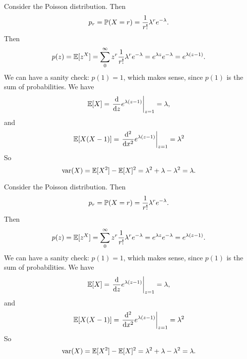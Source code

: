 \begin{note}
  \begin{field}
    \begin{eg}
      Consider the Poisson distribution. Then
      \[
        p_r = \P(X = r) = \frac{1}{r!}\lambda^r e^{-\lambda}.
      \]
      Then
      \[
        p(z) = \E[z^X] = \sum_0^\infty z^r \frac{1}{r!}\lambda^r e^{-\lambda} = e^{\lambda z}e^{-\lambda} = e^{\lambda(z - 1)}.
      \]
      We can have a sanity check: $p(1) = 1$, which makes sense, since $p(1)$ is the sum of probabilities.
      We have
      \[
        \E[X]= \left.\frac{\d }{\d z}e^{\lambda(z - 1)}\right|_{z = 1} = \lambda,
      \]
      and
      \[
        \E[X(X - 1)] = \left.\frac{\d ^2}{\d x^2}e^{\lambda(z - 1)}\right|_{z = 1} = \lambda^2
      \]
      So
      \[
        \var(X) = \E[X^2] - \E[X]^2 = \lambda^2 + \lambda - \lambda^2 = \lambda.
      \]
    \end{eg}
  \end{field}
  \begin{field}
    \begin{eg}
      Consider the Poisson distribution. Then
      \[
        p_r = \P(X = r) = \frac{1}{r!}\lambda^r e^{-\lambda}.
      \]
      Then
      \[
        p(z) = \E[z^X] = \sum_0^\infty z^r \frac{1}{r!}\lambda^r e^{-\lambda} = e^{\lambda z}e^{-\lambda} = e^{\lambda(z - 1)}.
      \]
      We can have a sanity check: $p(1) = 1$, which makes sense, since $p(1)$ is the sum of probabilities.
      We have
      \[
        \E[X]= \left.\frac{\d }{\d z}e^{\lambda(z - 1)}\right|_{z = 1} = \lambda,
      \]
      and
      \[
        \E[X(X - 1)] = \left.\frac{\d ^2}{\d x^2}e^{\lambda(z - 1)}\right|_{z = 1} = \lambda^2
      \]
      So
      \[
        \var(X) = \E[X^2] - \E[X]^2 = \lambda^2 + \lambda - \lambda^2 = \lambda.
      \]
    \end{eg}
  \end{field}
  \xplain{}%
\end{note}

